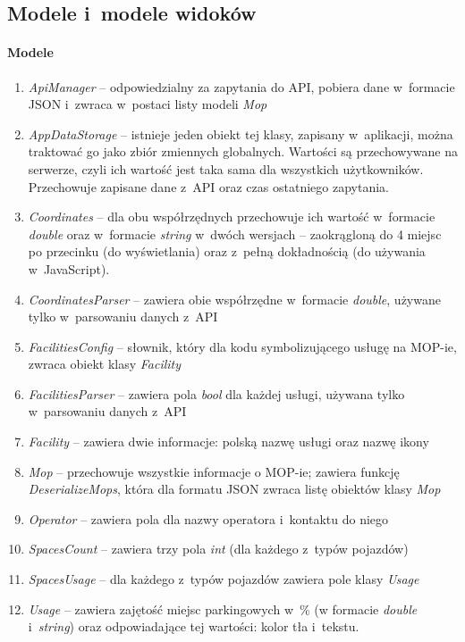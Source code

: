 \subsection{Modele i~modele widoków}
\paragraph{Modele}
\begin{enumerate}
\item \textit{ApiManager} -- odpowiedzialny za zapytania do API, pobiera dane w~formacie JSON i~zwraca w~postaci listy modeli \textit{Mop}
\item \textit{AppDataStorage} -- istnieje jeden obiekt tej klasy, zapisany w~aplikacji, można traktować go jako zbiór zmiennych globalnych. Wartości są przechowywane na serwerze, czyli ich wartość jest taka sama dla wszystkich użytkowników. Przechowuje zapisane dane z~API oraz czas ostatniego zapytania.
\item \textit{Coordinates} -- dla obu współrzędnych przechowuje ich wartość w~formacie \textit{double} oraz w~formacie \textit{string} w~dwóch wersjach -- zaokrągloną do 4 miejsc po przecinku (do wyświetlania) oraz z~pełną dokładnością (do używania w~JavaScript). 
\item \textit{CoordinatesParser} -- zawiera obie współrzędne w~formacie \textit{double}, używane tylko w~parsowaniu danych z~API
\item \textit{FacilitiesConfig} -- słownik, który dla kodu symbolizującego usługę na MOP-ie, zwraca obiekt klasy \textit{Facility}
\item \textit{FacilitiesParser} -- zawiera pola \textit{bool} dla każdej usługi, używana tylko w~parsowaniu danych z~API
\item \textit{Facility} -- zawiera dwie informacje: polską nazwę usługi oraz nazwę ikony
\item \textit{Mop} -- przechowuje wszystkie informacje o MOP-ie; zawiera funkcję \textit{DeserializeMops}, która dla formatu JSON zwraca listę obiektów klasy \textit{Mop}
\item \textit{Operator} -- zawiera pola dla nazwy operatora i~kontaktu do niego
\item \textit{SpacesCount} -- zawiera trzy pola \textit{int} (dla każdego z~typów pojazdów)
\item \textit{SpacesUsage} -- dla każdego z~typów pojazdów zawiera pole klasy \textit{Usage}
\item \textit{Usage} -- zawiera zajętość miejsc parkingowych w~\% (w formacie \textit{double} i~\textit{string}) oraz odpowiadające tej wartości: kolor tła i~tekstu.
\end{enumerate}

